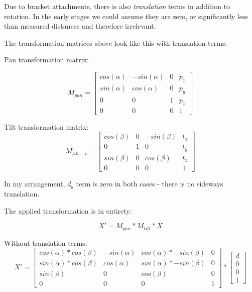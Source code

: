 \documentclass{article}
\begin{document}
Due to bracket attachments, there is also \emph{translation} 
terms in addition to rotation. 
In the early stages we could assume they 
are zero, or significantly less than measured distances and 
therefore irrelevant.

The transformation matrices above look like this with translation
terms:

Pan transformation matrix:

\begin{equation}
M_{pan} =
\begin{bmatrix}
  cos(\alpha) & -sin(\alpha) &	0	& p_x\\
  sin(\alpha) &	cos(\alpha)	 &  0   & p_y\\
  0			  & 0			 &	1	& p_z\\
  0			  &	0			 &	0	& 1
\end{bmatrix}
\end{equation}


Tilt transformation matrix:
\begin{equation}
M_{tilt-t} =
\begin{bmatrix}
  cos(\beta)  & 0		     &	-sin(\beta)	& t_x\\
  0			  &	1			 &  0   		& t_y \\
  sin(\beta)  & 0			 &	cos(\beta)	& t_z \\
  0			  &	0			 &	0	& 1
\end{bmatrix}
\end{equation}

In my arrangement, $d_y$ term is zero in both cases - there is no sideways translation.

The applied transformation is in entirety:

\begin{equation}
X' = M_{pan} * M_{tilt} * X
\end{equation}

Without translation terms:
\begin{equation}
X' =
\begin{bmatrix}
cos(\alpha)*cos(\beta)	& -sin(\alpha) & cos(\alpha)*-sin(\beta) & 0\\
sin(\alpha)*cos(\beta) 	& cos(\alpha) & sin(\alpha)*-sin(\beta) & 0\\
sin(\beta)	&	0 & cos(\beta)	&	0\\
0 & 0 & 0 & 1
\end{bmatrix}
*
\begin{bmatrix}
d \\ 0 \\ 0 \\ 1
\end{bmatrix}
\end{equation}
\end{document}
